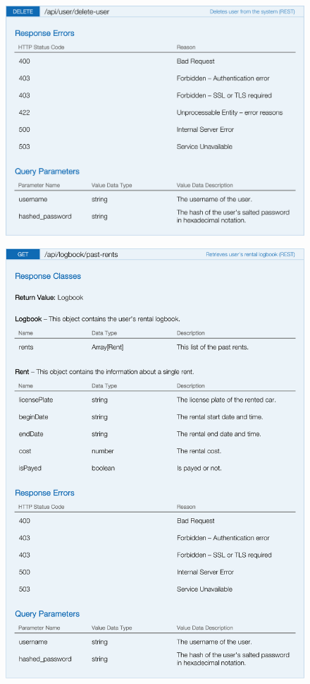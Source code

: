 \begin{figure}[H]
	\noindent
    	\centering
    	\includegraphics{apitables/APIDeleteUser.png}
    	\label{fig:api-delete-user}
\end{figure}

\begin{figure}[H]
	\noindent
    	\centering 
    	\includegraphics{apitables/APIPastRents.png}
    	\label{fig:api-past-rents}
\end{figure}

